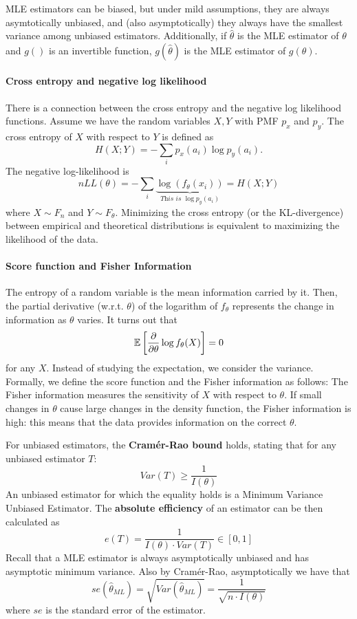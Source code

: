 MLE estimators can be biased, but under mild assumptions, they are always asymtotically unbiased, and (also asymptotically) they always have the smallest variance among unbiased estimators. Additionally, if $\hat{\theta}$ is the MLE estimator of $\theta$ and $g()$ is an invertible function, $g(\hat{\theta})$ is the MLE estimator of $g(\theta)$.

\paragraph{Cross entropy and negative log likelihood} There is a connection between the cross entropy and the negative log likelihood functions. Assume we have the random variables $X,Y$ with PMF $p_x$ and $p_y$. The cross entropy of $X$ with respect to $Y$ is defined as
\[
    H(X;Y) = - \sum_i p_x(a_i) \log p_y(a_i).
\]
The negative log-likelihood is
\[
    nLL(\theta) = - \sum_i \underset{\textit{This is } \log p_y(a_i)}{\underbrace{\log(f_{\theta}(x_i))}} = H(X;Y)
\]
where $X \sim F_n$ and $Y \sim F_{\theta}$. Minimizing the cross entropy (or the KL-divergence) between empirical and theoretical distributions is equivalent to maximizing the likelihood of the data.

\paragraph{Score function and Fisher Information}
The entropy of a random variable is the mean information carried by it. Then, the partial derivative (w.r.t. $\theta$) of the logarithm of $f_{\theta}$ represents the change in information as $\theta$ varies. It turns out that
\[
    \mathbb{E}\left[\frac{\partial}{\partial \theta} \log f_{\theta}(X)\right] = 0
\]
for any $X$. Instead of studying the expectation, we consider the variance. Formally, we define the score function and the Fisher information as follows:
The Fisher information measures the sensitivity of $X$ with respect to $\theta$. If small changes in $\theta$ cause large changes in the density function, the Fisher information is high: this means that the data provides information on the correct $\theta$.

For unbiased estimators, the \textbf{Cramér-Rao bound} holds, stating that for any unbiased estimator $T$:
\[
    Var(T) \geq \frac{1}{I(\theta)}
\]
An unbiased estimator for which the equality holds is a Minimum Variance Unbiased Estimator. The \textbf{absolute efficiency} of an estimator can be then calculated as
\[
    e(T) = \frac{1}{I(\theta) \cdot Var(T)} \in [0,1]
\]
Recall that a MLE estimator is always asymptotically unbiased and has asymptotic minimum variance. Also by Cramér-Rao, asymptotically we have that
\[
    se(\hat{\theta}_{ML}) = \sqrt{Var(\hat{\theta}_{ML})} = \frac{1}{\sqrt{n \cdot I(\theta)}}
\]
where $se$ is the standard error of the estimator.